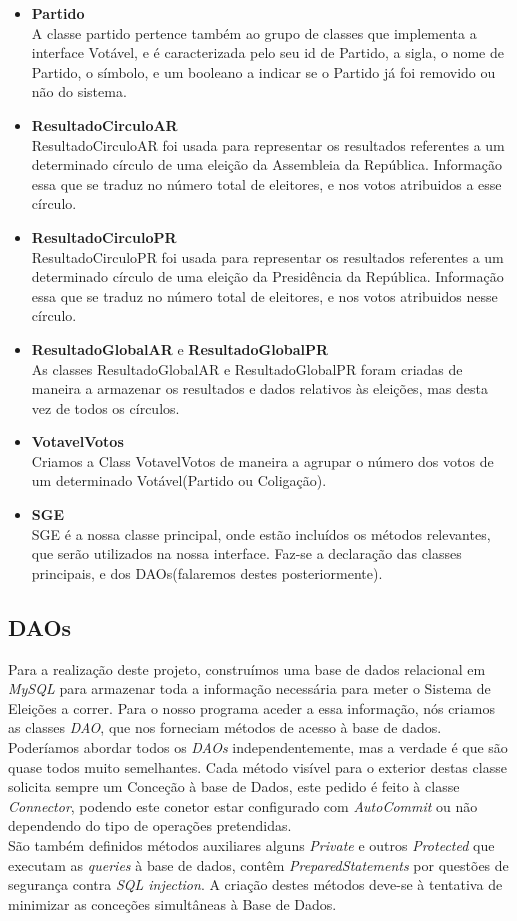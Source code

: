 \documentclass[a4paper,12pt]{report}
\begin{document}
\begin{itemize}
\item \textbf{Partido}
\\ A classe partido pertence também ao grupo de classes que implementa a interface Votável, e é caracterizada pelo seu id de Partido, a sigla, o nome de Partido, o símbolo, e um booleano a indicar se o Partido já foi removido ou não do sistema.
\item \textbf{ResultadoCirculoAR}
\\ ResultadoCirculoAR foi usada para representar os resultados referentes a um determinado círculo de uma eleição da Assembleia da República. Informação essa que se traduz no número total de eleitores, e nos votos atribuidos a esse círculo.
\item \textbf{ResultadoCirculoPR}
\\ ResultadoCirculoPR foi usada para representar os resultados referentes a um determinado círculo de uma eleição da Presidência da República. Informação essa que se traduz no número total de eleitores, e nos votos atribuidos nesse círculo.
\item \textbf{ResultadoGlobalAR} e \textbf{ResultadoGlobalPR}
\\ As classes ResultadoGlobalAR e ResultadoGlobalPR foram criadas de maneira a armazenar os resultados e dados relativos às eleições, mas desta vez de todos os círculos.
\item \textbf{VotavelVotos}
\\ Criamos a Class VotavelVotos de maneira a agrupar o número dos votos de um determinado Votável(Partido ou Coligação).
\item \textbf{SGE}
\\ SGE é a nossa classe principal, onde estão incluídos os métodos relevantes, que serão utilizados na nossa interface.
Faz-se a declaração das classes principais, e dos DAOs(falaremos destes posteriormente).
\newpage
\end{itemize}
\subsection{DAOs}
Para a realização deste projeto, construímos uma base de dados relacional em \emph{MySQL} para armazenar toda a informação necessária para meter o Sistema de Eleições a correr. Para o nosso programa aceder a essa informação, nós criamos as classes \emph{DAO}, que nos forneciam métodos de acesso à base de dados.
\\\indent Poderíamos abordar todos os \emph{DAOs} independentemente, mas a verdade é que são quase todos 
muito semelhantes. Cada método visível para o exterior destas classe solicita sempre um Conceção à base de Dados, este pedido é feito à classe \emph{Connector}, podendo este conetor estar configurado com \emph{AutoCommit} ou não dependendo do tipo de operações pretendidas.
\\\indent São também definidos métodos auxiliares alguns \emph{Private} e outros \emph{Protected} que executam as \emph{queries} à base de dados, contêm \emph{PreparedStatements} por questões de segurança contra \emph{SQL injection}. A criação destes métodos deve-se à tentativa de minimizar as conceções simultâneas à Base de Dados.
\end{document}
